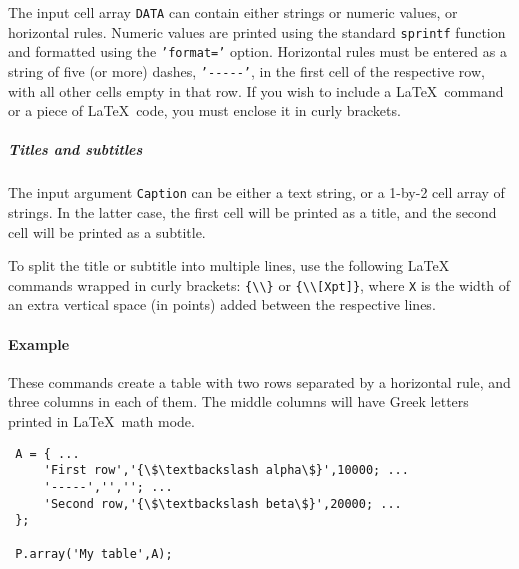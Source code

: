 The input cell array \texttt{DATA} can contain either strings or numeric
 values, or horizontal rules. Numeric values are printed using the
 standard \texttt{sprintf} function and formatted using the
 \texttt{'format='} option. Horizontal rules must be entered as a string
 of five (or more) dashes, \texttt{'-{}-{}-{}-{}-'}, in the first cell of
 the respective row, with all other cells empty in that row. If you wish
 to include a \LaTeX~command or a piece of \LaTeX~code, you must enclose
 it in curly brackets.
 
 \subparagraph{Titles and subtitles}
 
 The input argument \texttt{Caption} can be either a text string, or a
 1-by-2 cell array of strings. In the latter case, the first cell will be
 printed as a title, and the second cell will be printed as a subtitle.
 
 To split the title or subtitle into multiple lines, use the following
 LaTeX commands wrapped in curly brackets:
 \texttt{\{\textbackslash{}\textbackslash{}\}} or
 \texttt{\{\textbackslash{}\textbackslash{}{[}Xpt{]}\}}, where \texttt{X}
 is the width of an extra vertical space (in points) added between the
 respective lines.
 
 \paragraph{Example}
 
 These commands create a table with two rows separated by a horizontal
 rule, and three columns in each of them. The middle columns will have
 Greek letters printed in \LaTeX~math mode.
 
 \begin{verbatim}
 A = { ...
     'First row','{\$\textbackslash alpha\$}',10000; ...
     '-----','',''; ...
     'Second row,'{\$\textbackslash beta\$}',20000; ...
 };
 
 P.array('My table',A);
 \end{verbatim}


